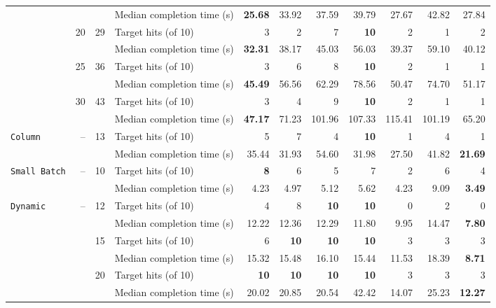 \documentclass{article}
\begin{document}
\begin{table}[htbp]
\begin{threeparttable}
\begin{tabular}{@{}lrrlrrrrrrr@{}}
 & &  & Median completion time (s) & \textbf{25.68} & 33.92 & 37.59 & 39.79 & 27.67 & 42.82 & 27.84 \\
\addlinespace[2pt]
 & \multirow{2}{*}{20} & \multirow{2}{*}{29} & Target hits (of 10) & 3 & 2 & 7 & \textbf{10} & 2 & 1 & 2 \\
 & &  & Median completion time (s) & \textbf{32.31} & 38.17 & 45.03 & 56.03 & 39.37 & 59.10 & 40.12 \\
\addlinespace[2pt]
 & \multirow{2}{*}{25} & \multirow{2}{*}{36} & Target hits (of 10) & 3 & 6 & 8 & \textbf{10} & 2 & 1 & 1 \\
 & &  & Median completion time (s) & \textbf{45.49} & 56.56 & 62.29 & 78.56 & 50.47 & 74.70 & 51.17 \\
\addlinespace[2pt]
 & \multirow{2}{*}{30} & \multirow{2}{*}{43} & Target hits (of 10) & 3 & 4 & 9 & \textbf{10} & 2 & 1 & 1 \\
 & &  & Median completion time (s) & \textbf{47.17} & 71.23 & 101.96 & 107.33 & 115.41 & 101.19 & 65.20 \\
\midrule
\multirow{2}{*}{\texttt{Column}} & \multirow{2}{*}{--} & \multirow{2}{*}{13} & Target hits (of 10) & 5 & 7 & 4 & \textbf{10} & 1 & 4 & 1 \\
 & &  & Median completion time (s) & 35.44 & 31.93 & 54.60 & 31.98 & 27.50 & 41.82 & \textbf{21.69} \\
\midrule
\multirow{2}{*}{\texttt{Small Batch}} & \multirow{2}{*}{--} & \multirow{2}{*}{10} & Target hits (of 10) & \textbf{8} & 6 & 5 & 7 & 2 & 6 & 4 \\
 & &  & Median completion time (s) & 4.23 & 4.97 & 5.12 & 5.62 & 4.23 & 9.09 & \textbf{3.49} \\
\midrule
\multirow{12}{*}{\texttt{Dynamic}} & \multirow{2}{*}{--} & \multirow{2}{*}{12} & Target hits (of 10) & 4 & 8 & \textbf{10} & \textbf{10} & 0 & 2 & 0 \\
 & &  & Median completion time (s) & 12.22 & 12.36 & 12.29 & 11.80 & 9.95 & 14.47 & \textbf{7.80} \\
\addlinespace[2pt]
 &  & \multirow{2}{*}{15} & Target hits (of 10) & 6 & \textbf{10} & \textbf{10} & \textbf{10} & 3 & 3 & 3 \\
 & &  & Median completion time (s) & 15.32 & 15.48 & 16.10 & 15.44 & 11.53 & 18.39 & \textbf{8.71} \\
\addlinespace[2pt]
 &  & \multirow{2}{*}{20} & Target hits (of 10) & \textbf{10} & \textbf{10} & \textbf{10} & \textbf{10} & 3 & 3 & 3 \\
 & &  & Median completion time (s) & 20.02 & 20.85 & 20.54 & 42.42 & 14.07 & 25.23 & \textbf{12.27} \\

\end{tabular}
\end{threeparttable}
\end{table}
\end{document}
